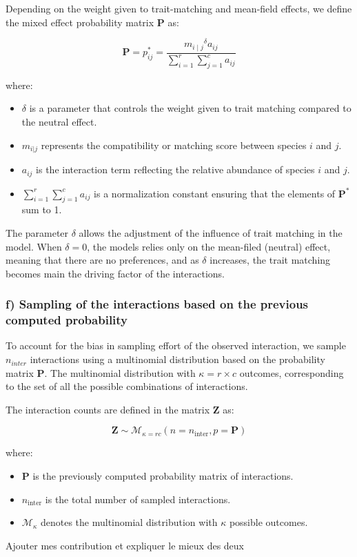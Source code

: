 Depending on the weight given to trait-matching and mean-field effects, we define the mixed effect probability matrix $\mathbf{P}$ as: 

$$
    \mathbf{P} = p^*_{ij} = \frac{{m_{i\mid j}}^\delta a_{ij}}{\sum_{i=1}^{r} \sum_{j=1}^{c}a_{ij}}
$$
    
where:
\begin{itemize}
\item  $\delta$ is a parameter that controls the weight given to trait matching compared to the neutral effect.
\item  $m_{i|j}$ represents the compatibility or matching score between species \(i\) and \(j\).
\item  $a_{ij}$ is the interaction term reflecting the relative abundance of species \(i\) and \(j\).
\item  $\sum_{i=1}^{r} \sum_{j=1}^{c}a_{ij}$ is a normalization constant ensuring that the elements of \(\mathbf{P}^*\) sum to 1.
\end{itemize}

The parameter $\delta$ allows the adjustment of the influence of trait matching in the model. When $\delta = 0$, the models relies only on the mean-filed (neutral) effect, meaning that there are no preferences, and as $\delta$ increases, the trait matching becomes main the driving factor of the interactions.



\subsubsection{f) Sampling of the interactions based on the previous computed probability}

To account for the bias in sampling effort of the observed interaction, we sample $n_{inter}$ interactions using a multinomial distribution based on the probability matrix $\mathbf{P}$. The multinomial distribution with $\kappa = r \times c$ outcomes, corresponding to the set of all the possible combinations of interactions.

The interaction counts are defined in the matrix $\mathbf{Z}$ as:

$$
    \mathbf{Z} \sim \mathcal{M}_{\kappa = rc}(n = n_\text{inter}, p = \mathbf{P})
$$

where:
\begin{itemize}
    \item $\mathbf{P}$ is the previously computed probability matrix of interactions.
    \item  $n_{\text{inter}}$ is the total number of sampled interactions.
    \item  $\mathcal{M}_{\kappa}$ denotes the multinomial distribution with \(\kappa\) possible outcomes.
\end{itemize}



Ajouter mes contribution et expliquer le mieux des deux
